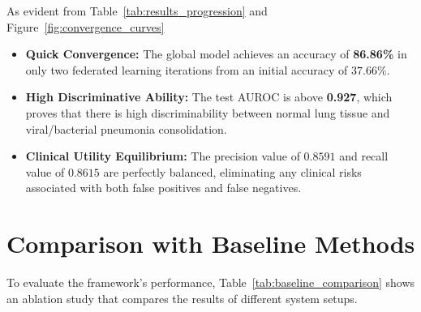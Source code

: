 \documentclass[12pt,a4paper]{report}
\begin{document}
As evident from Table~\ref{tab:results_progression} and Figure~\ref{fig:convergence_curves}
\begin{itemize}
    \item \textbf{Quick Convergence:} The global model achieves an accuracy of \textbf{86.86\%} in only two federated learning iterations from an initial accuracy of $37.66\%$.
    \item \textbf{High Discriminative Ability:} The test AUROC is above \textbf{0.927}, which proves that there is high discriminability between normal lung tissue and viral/bacterial pneumonia consolidation.
    \item \textbf{Clinical Utility Equilibrium:} The precision value of $0.8591$ and recall value of $0.8615$ are perfectly balanced, eliminating any clinical risks associated with both false positives and false negatives.
\end{itemize}

\section{Comparison with Baseline Methods}
To evaluate the framework’s performance, Table~\ref{tab:baseline_comparison} shows an ablation study that compares the results of different system setups.

\begin{table}[htbp]
\centering
\caption{Performance of Framework Configurations Compared}
\label{tab:baseline_comparison}
\end{table}
\end{document}
